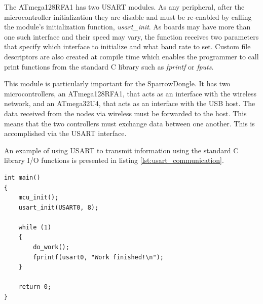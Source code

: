 The \mbox{ATmega128RFA1} has two USART modules. As any peripheral, after the
microcontroller initialization they are disable and must be re-enabled by
calling the module's initialization function, \emph{usart\_init}. As boards may
have more than one such interface and their speed may vary, the function
receives two parameters that specify which interface to initialize and what
baud rate to set. Custom file descriptors are also created at compile time
which enables the programmer to call print functions from the standard C
library such as \emph{fprintf} or \emph{fputs}.

This module is particularly important for the SparrowDongle. It has two
microcontrollers, an \mbox{ATmega128RFA1}, that acts as an interface with the
wireless network, and an \mbox{ATmega32U4}, that acts as an interface with the
USB host. The data received from the nodes via wireless must be forwarded to
the host. This means that the two controllers must exchange data between one
another. This is accomplished via the USART interface.

An example of using USART to transmit information using the standard C library
I/O functions is presented in listing \ref{lst:usart_communication}.

\lstset{
	language=C, numbers=none, caption=USART communication snippet,
	label=lst:usart_communication
}
\begin{lstlisting}
int main()
{
	mcu_init();
	usart_init(USART0, 8);

	while (1)
	{
		do_work();
		fprintf(usart0, "Work finished!\n");
	}

	return 0;
}
\end{lstlisting}

